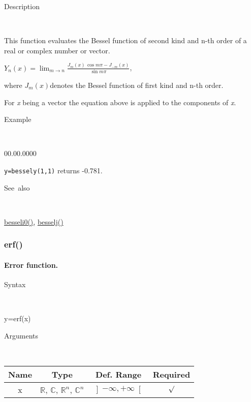 \begin{description}
\item [Description]~
\end{description}
This function evaluates the Bessel function of second kind and n-th
order of a real or complex number or vector.

\medskip{}
$Y_{n}\left(x\right)={\displaystyle \lim_{m\rightarrow n}\frac{J_{m}\left(x\right)\,\cos m\pi-J_{-m}\left(x\right)}{\sin m\pi}}$,
\medskip{}

where $J_{m}\left(x\right)$denotes the Bessel function of first kind
and n-th order.
\medskip{}

\noindent For \textit{x} being a vector the equation above is applied
to the components of \textit{x}.

\begin{description}
\item [Example]~
\end{description}
\begin{lyxlist}{00.00.0000}
\item [\texttt{y=bessely(1,1)}]returns -0.781.
\end{lyxlist}
\begin{description}
\item [See~also]~
\end{description}
\textcolor{blue}{\hyperlink{besseli0}{besseli0()}}\textcolor{black}{,}
\textcolor{blue}{\hyperlink{besselj}{besselj()}}


\newpage
\subsubsection*{\hypertarget{erf}{}{\Large erf()}}


\paragraph{\label{par:Error-function}Error function.}

\begin{description}
\item [Syntax]~
\end{description}
y=erf(x)

\begin{description}
\item [Arguments]~
\end{description}
\begin{tabular}{|c|c|c|c|}
\hline 
Name&
Type&
Def. Range&
Required\tabularnewline
\hline
\hline 
x&
$\mathbb{R}$, $\mathbb{C}$, $\mathbb{R}^{n}$, $\mathbb{C}^{n}$&
$\left]-\infty,+\infty\right[$&
$\surd$\tabularnewline
\hline
\end{tabular}

